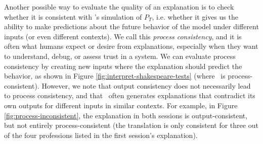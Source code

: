 Another possible way to evaluate the quality of an explanation is to check whether it is consistent with \DV's simulation of $P_T$, i.e. whether it gives us the ability to make predictions about the future behavior of the model under different inputs (or even different contexts). We call this \emph{process consistency}, and it is often what humans expect or desire from explanations, especially when they want to understand, debug, or assess trust in a system.
We can evaluate process consistency by creating new inputs where the explanation should predict the behavior, as shown in Figure \ref{fig:interpret-shakespeare-tests} (where \DV\ is process-consistent).
However, we note that output consistency does not necessarily lead to process consistency, and that \DV\ often generates explanations that contradict its own outputs for different inputs in similar contexts. For example, in Figure \ref{fig:process-inconsistent}, the explanation in both sessions is output-consistent, but not entirely process-consistent (the translation is only consistent for three out of the four professions listed in the first session's explanation).

